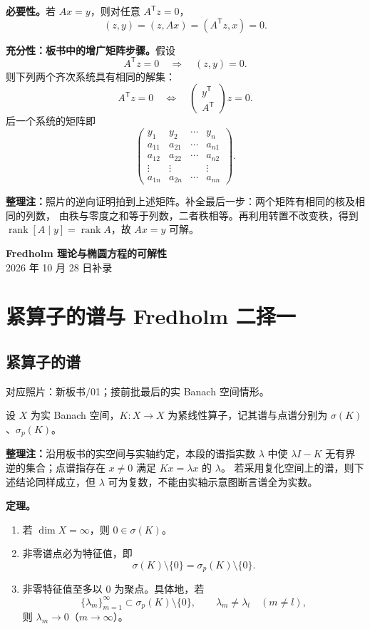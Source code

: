 \documentclass[UTF8,a4paper,11pt,fontset=fandol]{ctexart}
\newcommand{\ednote}[1]{\par{\small\color{notegray}\textbf{整理注：}#1}\par}
\newcommand{\source}[1]{{\small\color{notegray}对应照片：#1。}\par}
\begin{document}
\textbf{必要性。}若 $Ax=y$，则对任意 $A^{\mathsf T}z=0$，
\[
(z,y)=(z,Ax)=(A^{\mathsf T}z,x)=0.
\]

\textbf{充分性：板书中的增广矩阵步骤。}假设
\[
A^{\mathsf T}z=0\quad\Longrightarrow\quad (z,y)=0.
\]
则下列两个齐次系统具有相同的解集：
\[
A^{\mathsf T}z=0
\quad\Longleftrightarrow\quad
\begin{pmatrix}y^{\mathsf T}\\ A^{\mathsf T}\end{pmatrix}z=0.
\]
后一个系统的矩阵即
\[
\begin{pmatrix}
y_1&y_2&\cdots&y_n\\
a_{11}&a_{21}&\cdots&a_{n1}\\
a_{12}&a_{22}&\cdots&a_{n2}\\
\vdots&\vdots&&\vdots\\
a_{1n}&a_{2n}&\cdots&a_{nn}
\end{pmatrix}.
\]
\ednote{照片的逆向证明拍到上述矩阵。补全最后一步：两个矩阵有相同的核及相同的列数，
由秩与零度之和等于列数，二者秩相等。再利用转置不改变秩，得到
$\operatorname{rank}[A\mid y]=\operatorname{rank}A$，故 $Ax=y$ 可解。}

\newpage
{}
\begin{center}
{\LARGE\bfseries Fredholm 理论与椭圆方程的可解性}\\[5pt]
{2026 年 10 月 28 日补录}
\end{center}

\section{紧算子的谱与 Fredholm 二择一}
\subsection{紧算子的谱}
\source{新板书/01；接前批最后的实 Banach 空间情形}
设 $X$ 为实 Banach 空间，$K:X\to X$ 为紧线性算子，记其谱与点谱分别为
$\sigma(K)$、$\sigma_p(K)$。
\ednote{沿用板书的实空间与实轴约定，本段的谱指实数 $\lambda$ 中使
$\lambda I-K$ 无有界逆的集合；点谱指存在 $x\ne0$ 满足 $Kx=\lambda x$ 的 $\lambda$。
若采用复化空间上的谱，则下述结论同样成立，但 $\lambda$ 可为复数，不能由实轴示意图断言谱全为实数。}

\textbf{定理。}
\begin{enumerate}
\item 若 $\dim X=\infty$，则 $0\in\sigma(K)$。
\item 非零谱点必为特征值，即
\[
\sigma(K)\setminus\{0\}=\sigma_p(K)\setminus\{0\}.
\]
\item 非零特征值至多以 $0$ 为聚点。具体地，若
\[
\{\lambda_m\}_{m=1}^{\infty}\subset\sigma_p(K)\setminus\{0\},
\qquad\lambda_m\ne\lambda_l\quad(m\ne l),
\]
则 $\lambda_m\to0$（$m\to\infty$）。
\end{enumerate}
\end{document}
